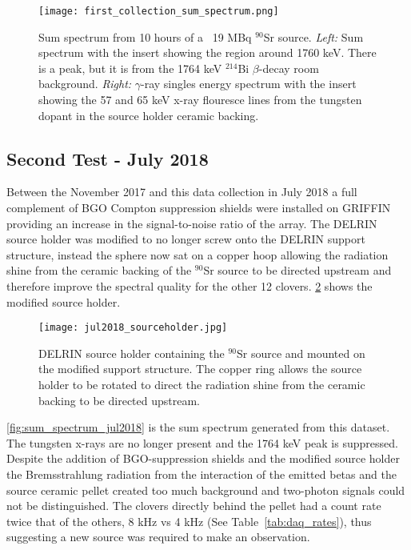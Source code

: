 \documentclass[cnatzke_thesis_proposal.tex]{subfiles}
\begin{document}
\begin{figure}[htbp]
  \centering
  \texttt{[image: first\_collection\_sum\_spectrum.png]}
  \caption{Sum spectrum from 10 hours of a ~19 MBq $^{90}$Sr source.
    \textit{Left:} Sum spectrum with the insert showing the region around 1760 keV. There is a peak, but it is from the 1764 keV $^{214}$Bi $\beta$-decay room background.
    \textit{Right:} $\gamma$-ray singles energy spectrum with the insert showing the 57 and 65 keV x-ray flouresce lines from the tungsten dopant in the source holder ceramic backing.
  }
  \label{fig:sum_spectrum_jul2017}
\end{figure}

\subsection{Second Test - July 2018}
Between the November 2017 and this data collection in July 2018 a full complement of BGO Compton suppression shields were installed on GRIFFIN providing an increase in the signal-to-noise ratio of the array.
The DELRIN source holder was modified to no longer screw onto the DELRIN support structure, instead the sphere now sat on a copper hoop allowing the radiation shine from the ceramic backing of the $^{90}$Sr source to be directed upstream and therefore improve the spectral quality for the other 12 clovers.
\ref{fig:source_holder_jul2018} shows the modified source holder.

\begin{figure}[htbp]
  \centering
  \texttt{[image: jul2018\_sourceholder.jpg]}
  \caption{DELRIN source holder containing the $^{90}$Sr source and mounted on the modified support structure. The copper ring allows the source holder to be rotated to direct the radiation shine from the ceramic backing to be directed upstream.}
  \label{fig:source_holder_jul2018}
\end{figure}

\ref{fig:sum_spectrum_jul2018} is the sum spectrum generated from this dataset. 
The tungsten x-rays are no longer present and the 1764 keV peak is suppressed. 
Despite the addition of BGO-suppression shields and the modified source holder the Bremsstrahlung radiation from the interaction of the emitted betas and the source ceramic pellet created too much background and two-photon signals could not be distinguished.
The clovers directly behind the pellet had a count rate twice that of the others, 8 kHz vs 4 kHz (See Table~\ref{tab:daq_rates}), thus suggesting a new source was required to make an observation.
\end{document}
